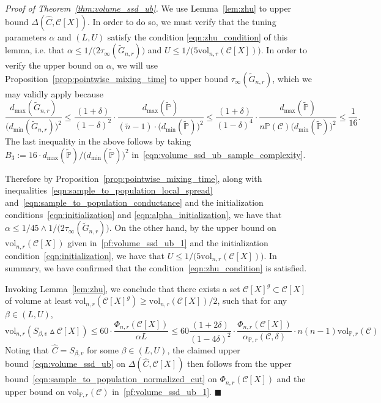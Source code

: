 \documentclass[twoside,11pt]{article}
\newcommand{\1}{\mathbf{1}}
\newcommand{\mc}[1]{\mathcal{#1}}
\newcommand{\Pbb}{\mathbb{P}}
\newcommand{\wt}[1]{\widetilde{#1}}
\newcommand{\wh}[1]{\widehat{#1}}
\newcommand{\vol}{\mathrm{vol}}
\newcommand{\qed}{\hfill $\blacksquare$}
\begin{document}

\noindent \emph{Proof of Theorem~\ref{thm:volume_ssd_ub}.}
We use Lemma~\ref{lem:zhu} to upper bound $\Delta(\wh{C},\mc{C}[X])$. In order to do so, we must verify that the tuning parameters $\alpha$ and $(L,U)$ satisfy the condition \eqref{eqn:zhu_condition} of this lemma, i.e. that $\alpha \leq 1/\bigl(2\tau_{\infty}(\wt{G}_{n,r})\bigr)$ and $U \leq 1/\bigl(5 \vol_{n,r}(\mc{C}[X])\bigr)$. In order to verify the upper bound on $\alpha$, we will use Proposition~\ref{prop:pointwise_mixing_time} to upper bound $\tau_{\infty}(\wt{G}_{n,r})$, which we may validly apply because
\begin{equation*}
\frac{d_{\max}(\wt{G}_{n,r})}{\bigl(d_{\min}(\wt{G}_{n,r})\bigr)^2} \leq \frac{(1 + \delta)}{(1 - \delta)^2} \cdot \frac{d_{\max}(\wt{\Pbb})}{(\wt{n} - 1) \cdot \bigl(d_{\min}(\wt{\Pbb})\bigr)^2} \leq \frac{(1 + \delta)}{(1 - \delta)^4} \cdot \frac{d_{\max}(\wt{\Pbb})}{n\Pbb(\mc{C})\bigl(d_{\min}(\wt{\Pbb})\bigr)^2} \leq \frac{1}{16}.
\end{equation*}
The last inequality in the above follows by taking $B_3 := 16 \cdot d_{\max}(\wt{\Pbb})/\bigl(d_{\min}(\wt{\Pbb})\bigr)^2$ in~\eqref{eqn:volume_ssd_ub_sample_complexity}.

Therefore by Proposition~\ref{prop:pointwise_mixing_time}, along with inequalities~\eqref{eqn:sample_to_population_local_spread} and~\eqref{eqn:sample_to_population_conductance} and the initialization conditions~\eqref{eqn:initialization} and \eqref{eqn:alpha_initialization}, we have that $\alpha \leq 1/45 \wedge 1/\bigl(2\tau_{\infty}(\wt{G}_{n,r})\bigr)$.  
On the other hand, by the upper bound on $\vol_{n,r}(\mc{C}[X])$ given in~\eqref{pf:volume_ssd_ub_1} and the initialization condition~\eqref{eqn:initialization}, we have that $U \leq 1/\bigl(5 \vol_{n,r}(\mc{C}[X])\bigr)$. In summary, we have confirmed that the condition~\eqref{eqn:zhu_condition} is satisfied.

Invoking Lemma~\ref{lem:zhu}, we conclude that there exists a set $\mc{C}[X]^g \subset \mc{C}[X]$ of volume at least $\vol_{n,r}(\mc{C}[X]^g) \geq \vol_{n,r}(\mc{C}[X])/2$, such that for any $\beta \in (L,U)$,
\begin{equation*}
\vol_{n,r}(S_{\beta,v} \vartriangle \mc{C}[X]) \leq 60 \cdot \frac{\Phi_{n,r}(\mc{C}[X])}{\alpha L} \leq 60 \frac{(1 + 2\delta)}{(1 - 4\delta)^2} \cdot \frac{\Phi_{n,r}(\mc{C}[X])}{\alpha_{\Pbb,r}(\mc{C},\delta)}\cdot n(n-1)\vol_{\Pbb,r}(\mc{C})
\end{equation*}
Noting that $\wh{C} = S_{\beta,v}$ for some $\beta \in (L,U)$, the claimed upper bound~\eqref{eqn:volume_ssd_ub} on $\Delta(\wh{C},\mc{C}[X])$ then follows from the upper bound~\eqref{eqn:sample_to_population_normalized_cut} on $\Phi_{n,r}(\mc{C}[X])$ and the upper bound on $\vol_{\Pbb,r}(\mc{C})$ in~\eqref{pf:volume_ssd_ub_1}. \qed
\end{document}
